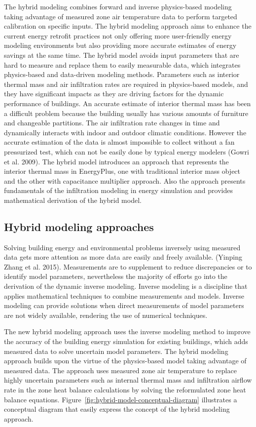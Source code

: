 The hybrid modeling combines forward and inverse physics-based modeling taking advantage of measured zone air temperature data to perform targeted calibration on specific inputs. The hybrid modeling approach aims to enhance the current energy retrofit practices not only offering more user-friendly energy modeling environments but also providing more accurate estimates of energy savings at the same time. The hybrid model avoids input parameters that are hard to measure and replace them to easily measurable data, which integrates physics-based and data-driven modeling methods. Parameters such as interior thermal mass and air infiltration rates are required in physics-based models, and they have significant impacts as they are driving factors for the dynamic performance of buildings. An accurate estimate of interior thermal mass has been a difficult problem because the building usually has various amounts of furniture and changeable partitions. The air infiltration rate changes in time and dynamically interacts with indoor and outdoor climatic conditions. However the accurate estimation of the data is almost impossible to collect without a fan pressurized test, which can not be easily done by typical energy modelers (Gowri et al. 2009). The hybrid model introduces an approach that represents the interior thermal mass in EnergyPlus, one with traditional interior mass object and the other with capacitance multiplier approach. Also the approach presents fundamentals of the infiltration modeling in energy simulation and provides mathematical derivation of the hybrid model. 

\subsection{Hybrid modeling approaches}\label{hybrid-modeling-approaches}

Solving building energy and environmental problems inversely using measured data gets more attention as more data are easily and freely available. (Yinping Zhang et al. 2015). Measurements are to supplement to reduce discrepancies or to identify model parameters, nevertheless the majority of efforts go into the derivation of the dynamic inverse modeling. Inverse modeling is a discipline that applies mathematical techniques to combine measurements and models. Inverse modeling can provide solutions when direct measurements of model parameters are not widely available, rendering the use of numerical techniques.

The new hybrid modeling approach uses the inverse modeling method to improve the accuracy of the building energy simulation for existing buildings, which adds measured data to solve uncertain model parameters. The hybrid modeling approach builds upon the virtue of the physics-based model taking advantage of measured data. The approach uses measured zone air temperature to replace highly uncertain parameters such as internal thermal mass and infiltration airflow rate in the zone heat balance calculations by solving the reformulated zone heat balance equations. Figure~\ref{fig:hybrid-model-conceptual-diagram} illustrates a conceptual diagram that easily express the concept of the hybrid modeling approach. 


